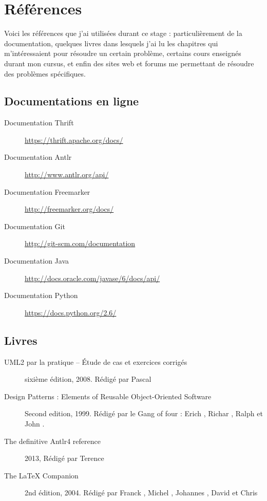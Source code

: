 \chapter{Références}\label{references}	
Voici les références que j'ai utilisées durant ce stage : particulièrement de la documentation, quelques livres dans lesquels j'ai lu les chapitres qui m'intéressaient pour résoudre un certain problème, certains cours enseignés durant mon cursus, et enfin des sites web et forums me permettant de résoudre des problèmes spécifiques.

\section{Documentations en ligne}
\begin{description}
	\item[Documentation Thrift] \url{https://thrift.apache.org/docs/}
	\item[Documentation Antlr] \url{http://www.antlr.org/api/}
	\item[Documentation Freemarker] \url{http://freemarker.org/docs/}
	\item[Documentation Git] \url{http://git-scm.com/documentation}	
	\item[Documentation Java] \url{http://docs.oracle.com/javase/6/docs/api/}
	\item[Documentation Python] \url{https://docs.python.org/2.6/}
\end{description}

\section{Livres}
	\begin{description}
	\item[UML2 par la pratique -- \'Etude de cas et exercices corrigés] sixième édition, 2008. Rédigé par Pascal 
	\item[Design Patterns : Elements of Reusable Object-Oriented Software] Second edition, 1999. Rédigé par le Gang of four : Erich , Richar , Ralph  et John .	
		\item[The definitive Antlr4 reference] 2013, Rédigé par Terence 
	\item[The \LaTeX{} Companion] 2nd édition, 2004. Rédigé par Franck , Michel , Johannes , David  et Chris  
\end{description}
